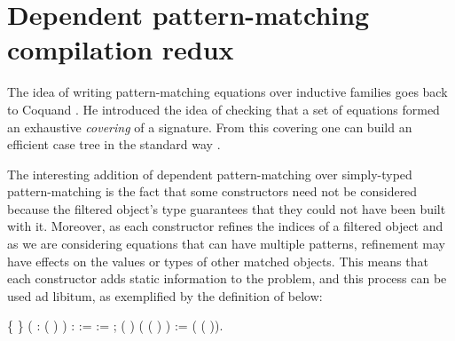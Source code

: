 \section{Dependent pattern-matching compilation redux}
\label{sec:sketch-patt-match}

The idea of writing pattern-matching equations over inductive families
goes back to Coquand \cite{coquand92baastad}. He introduced the idea of checking
that a set of equations formed an exhaustive \emph{covering} of a
signature. From this covering one can build an efficient case tree in
the standard way \cite{DBLP:conf/fpca/Augustsson85}.

The interesting addition of dependent pattern-matching over simply-typed
pattern-matching is the fact that some constructors need not be
considered because the filtered object's type guarantees that they
could not have been built with it. Moreover, as each constructor refines
the indices of a filtered object and as we are considering equations
that can have multiple patterns, refinement may have effects on the
values or types of other matched objects. This means that each
constructor adds static information to the problem, and this process 
can be used ad libitum, as exemplified by the definition of
 below:

\begin{coqdoccode}
\coqdocemptyline
\coqdocnoindent
{}  \{ \} 
( :  (  ) ) :    :=\coqdoceol
\coqdocnoindent
{}    :=  ;\coqdoceol
\coqdocnoindent
{}  ( ) ( (   )  ) := 
  ( (  )).\coqdoceol
\coqdocnoindent
\end{coqdoccode}


